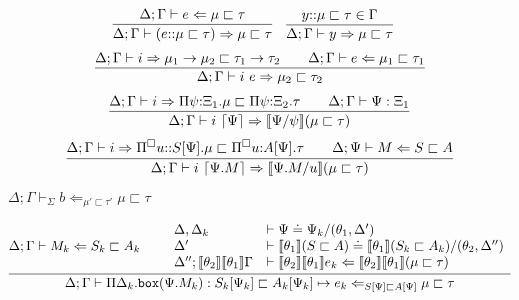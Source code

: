 \documentclass[letterpaper, 11pt]{article}
\newcommand{\Rar}{\Rightarrow}
\newcommand{\Lar}{\Leftarrow}
\newcommand{\rar}{\rightarrow}
\newcommand{\bbox}{\texttt{box}}
\begin{document}
    \begin{align*}
      & \infer{\Delta; \Gamma \vdash (e {::} \mu \sqsubset \tau) \Rar \mu \sqsubset \tau}
        {
          \Delta; \Gamma \vdash e \Lar \mu \sqsubset \tau
        } &
      & \infer{ \Delta; \Gamma \vdash y \Rar \mu \sqsubset \tau}{y{::}\mu \sqsubset \tau \in \Gamma}
    \end{align*}
    \begin{align*}
      \infer{ \Delta; \Gamma \vdash i \ e \Rar \mu_2 \sqsubset \tau_2}
            {
               \Delta; \Gamma \vdash i \Rar \mu_1 \rar \mu_2 \sqsubset \tau_1 \rar \tau_2
              &&
               \Delta; \Gamma \vdash e \Lar \mu_1 \sqsubset \tau_1
            }
    \end{align*}
    \begin{align*}
      \infer{ \Delta; \Gamma \vdash i \ \lceil \Psi \rceil \Rar \llbracket \Psi/\psi \rrbracket (\mu \sqsubset \tau)}
            {
               \Delta; \Gamma \vdash i \Rar \Pi \psi{:}\Xi_1. \mu \sqsubset \Pi \psi{:}\Xi_2. \tau
              &&
               \Delta; \Gamma \vdash \Psi : \Xi_1
            }
    \end{align*}
    \begin{align*}
      \infer{ \Delta; \Gamma \vdash i \ \lceil \Psi. M \rceil \Rar \llbracket \Psi. M / u \rrbracket (\mu \sqsubset \tau)}
            {
               \Delta; \Gamma \vdash i \Rar \Pi^\square u{::}S[\Psi]. \mu \sqsubset \Pi^\square u{:}A[\Psi]. \tau
              &&
               \Delta; \Psi \vdash M \Lar S \sqsubset A
            }
    \end{align*}

    $\boxed{ \Delta; \Gamma \vdash_\Sigma b \Lar_{\mu' \sqsubset \tau'} \mu \sqsubset \tau}$

    \begin{align*}
      \infer{ \Delta; \Gamma \vdash \Pi \Delta_k . \bbox(\Psi. M_k) : S_k[\Psi_k]  \sqsubset A_k[\Psi_k] \mapsto e_k 
                                                \Lar_{S[\Psi] \sqsubset A[\Psi]} \mu \sqsubset \tau}
            {
               \Delta; \Gamma \vdash M_k \Lar S_k \sqsubset A_k
              &&
              \begin{array}{ll}
                 \Delta, \Delta_k & \vdash \Psi \doteq \Psi_k / (\theta_1, \Delta') \\
                 \Delta'          & \vdash \llbracket \theta_1 \rrbracket ( S \sqsubset A) \doteq 
                                                  \llbracket \theta_1 \rrbracket(S_k \sqsubset A_k)/(\theta_2, \Delta'') \\
                 \Delta'';\llbracket \theta_2 \rrbracket \llbracket \theta_1 \rrbracket \Gamma & \vdash
                                        \llbracket \theta_2 \rrbracket \llbracket \theta_1 \rrbracket e_k 
                                        \Lar \llbracket \theta_2 \rrbracket \llbracket \theta_1 \rrbracket (\mu \sqsubset \tau)
              \end{array}
            }
    \end{align*}
\end{document}
